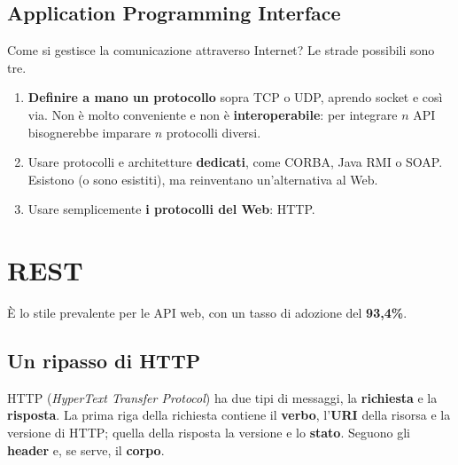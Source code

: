 \subsection{Application Programming Interface}


Come si gestisce la comunicazione attraverso Internet? Le strade possibili sono tre.
\begin{enumerate}
  \item \textbf{Definire a mano un protocollo} sopra TCP o UDP, aprendo socket e così via. Non è molto conveniente e non è
        \textbf{interoperabile}: per integrare $n$ API bisognerebbe imparare $n$ protocolli diversi.
  \item Usare protocolli e architetture \textbf{dedicati}, come CORBA, Java RMI o SOAP. Esistono (o sono esistiti), ma
        reinventano un'alternativa al Web.
  \item Usare semplicemente \textbf{i protocolli del Web}: HTTP.
\end{enumerate}

\section{REST}


È lo stile prevalente per le API web, con un tasso di adozione del \textbf{93,4\%}.

\subsection{Un ripasso di HTTP}

HTTP (\textit{HyperText Transfer Protocol}) ha due tipi di messaggi, la \textbf{richiesta} e la \textbf{risposta}. La prima
riga della richiesta contiene il \textbf{verbo}, l'\textbf{URI} della risorsa e la versione di HTTP; quella della risposta
la versione e lo \textbf{stato}. Seguono gli \textbf{header} e, se serve, il \textbf{corpo}.

